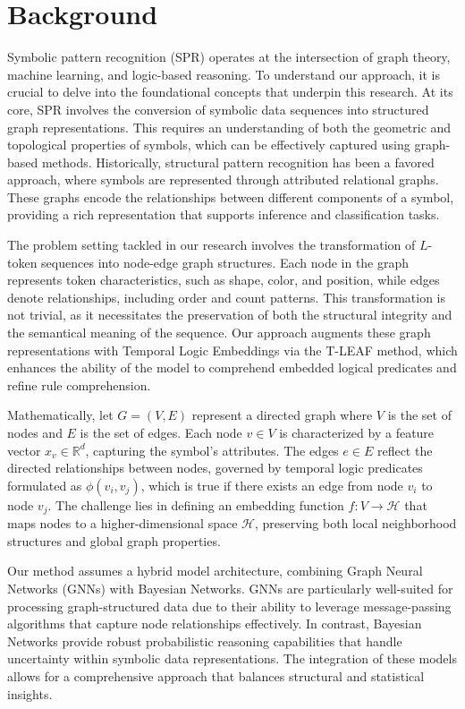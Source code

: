 \documentclass{article}
\begin{document}
\section{Background}
Symbolic pattern recognition (SPR) operates at the intersection of graph theory, machine learning, and logic-based reasoning. To understand our approach, it is crucial to delve into the foundational concepts that underpin this research. At its core, SPR involves the conversion of symbolic data sequences into structured graph representations. This requires an understanding of both the geometric and topological properties of symbols, which can be effectively captured using graph-based methods. Historically, structural pattern recognition has been a favored approach, where symbols are represented through attributed relational graphs. These graphs encode the relationships between different components of a symbol, providing a rich representation that supports inference and classification tasks.

The problem setting tackled in our research involves the transformation of $L$-token sequences into node-edge graph structures. Each node in the graph represents token characteristics, such as shape, color, and position, while edges denote relationships, including order and count patterns. This transformation is not trivial, as it necessitates the preservation of both the structural integrity and the semantical meaning of the sequence. Our approach augments these graph representations with Temporal Logic Embeddings via the T-LEAF method, which enhances the ability of the model to comprehend embedded logical predicates and refine rule comprehension.

Mathematically, let $G = (V, E)$ represent a directed graph where $V$ is the set of nodes and $E$ is the set of edges. Each node $v \in V$ is characterized by a feature vector $x_v \in \mathbb{R}^d$, capturing the symbol's attributes. The edges $e \in E$ reflect the directed relationships between nodes, governed by temporal logic predicates formulated as $\phi(v_i, v_j)$, which is true if there exists an edge from node $v_i$ to node $v_j$. The challenge lies in defining an embedding function $f: V \to \mathcal{H}$ that maps nodes to a higher-dimensional space $\mathcal{H}$, preserving both local neighborhood structures and global graph properties.

Our method assumes a hybrid model architecture, combining Graph Neural Networks (GNNs) with Bayesian Networks. GNNs are particularly well-suited for processing graph-structured data due to their ability to leverage message-passing algorithms that capture node relationships effectively. In contrast, Bayesian Networks provide robust probabilistic reasoning capabilities that handle uncertainty within symbolic data representations. The integration of these models allows for a comprehensive approach that balances structural and statistical insights.
\end{document}
